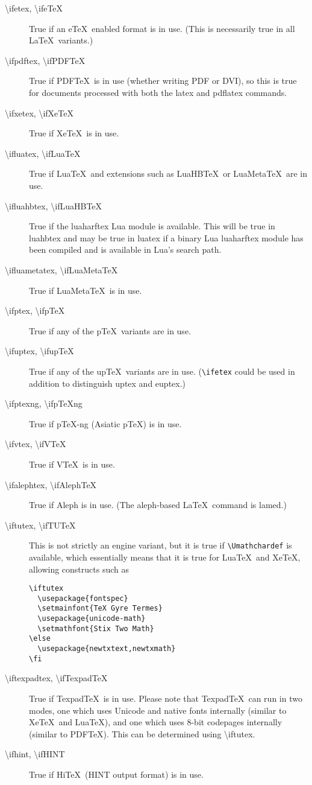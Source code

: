 \documentclass{article}
\newcommand\cs[1]{{\ttfamily\textbackslash #1}}
\begin{document}
\begin{description}
\item[\cs{ifetex},      \cs{ifeTeX}]
True if an e\TeX\ enabled format is in use. (This is necessarily true
in all \LaTeX\ variants.)
\item[\cs{ifpdftex},    \cs{ifPDFTeX}]
True if PDF\TeX\ is in use (whether writing PDF or DVI), so this is
true for documents processed with both the  \textsf{latex} and
\textsf{pdflatex} commands.
\item[\cs{ifxetex},     \cs{ifXeTeX}]
True if Xe\TeX\ is in use.
\item[\cs{ifluatex},    \cs{ifLuaTeX}]
True if Lua\TeX\ and extensions such as LuaHB\TeX\ or LuaMeta\TeX\ are in use.
\item[\cs{ifluahbtex},  \cs{ifLuaHBTeX}]
True if the \textsf{luaharftex} Lua module is available.
This will be true in \textsf{luahbtex} and may be true in
\textsf{luatex} if a binary Lua \textsf{luaharftex} module has been
compiled and is available in Lua's search path.
\item[\cs{ifluametatex},  \cs{ifLuaMetaTeX}]
True if LuaMeta\TeX\ is in use.
\item[\cs{ifptex},      \cs{ifpTeX}]
True if any of the p\TeX\ variants are in use.
\item[\cs{ifuptex},     \cs{ifupTeX}]
True if any of the up\TeX\ variants are in use. (\verb|\ifetex| could
be used in addition to distinguish \textsf{uptex} and \textsf{euptex}.)
\item[\cs{ifptexng},    \cs{ifpTeXng}]
True if p\TeX-ng (Asiatic p\TeX) is in use.
\item[\cs{ifvtex},      \cs{ifVTeX}]
True if V\TeX\ is in use.
\item[\cs{ifalephtex},  \cs{ifAlephTeX}]
True if Aleph is in use. (The \textsf{aleph}-based \LaTeX\ command is
\textsf{lamed}.)
\item[\cs{iftutex},     \cs{ifTUTeX}]
This is not strictly an engine variant, but it is true if
\verb|\Umathchardef| is available, which essentially means that it is
true for Lua\TeX\ and Xe\TeX, allowing constructs such as
\begin{verbatim}
\iftutex
  \usepackage{fontspec}
  \setmainfont{TeX Gyre Termes}
  \usepackage{unicode-math}
  \setmathfont{Stix Two Math}
\else
  \usepackage{newtxtext,newtxmath}
\fi
\end{verbatim}
\item[\cs{iftexpadtex}, \cs{ifTexpadTeX}]
True if Texpad\TeX\ is in use. Please note that Texpad\TeX\ can run in two
modes, one which uses Unicode and native fonts internally (similar to
Xe\TeX\ and Lua\TeX), and one which uses 8-bit codepages internally (similar to
PDF\TeX). This can be determined using \cs{iftutex}.
\item[\cs{ifhint}, \cs{ifHINT}]
True if Hi\TeX\ (HINT output format) is in use.
\end{description}
\end{document}

